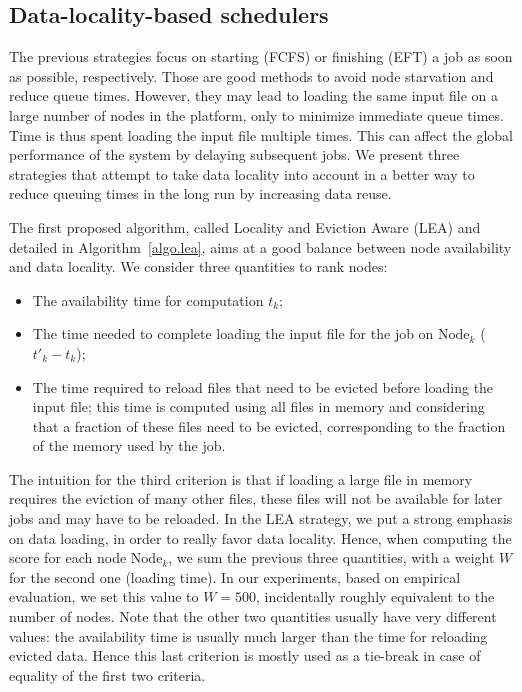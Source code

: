 \documentclass[conference]{IEEEtran}
\newcommand{\Node}[1]{\ensuremath{\mathrm{Node}_{#1}}\xspace}
\begin{document}
\subsection{Data-locality-based schedulers}

The previous strategies focus on starting (FCFS) or finishing (EFT) a job
as soon as possible, respectively.  Those are good methods
to avoid node starvation and reduce queue times.  However, they
may lead to loading the same input file on a large number of nodes in
the platform, only to minimize immediate queue times. Time is thus spent
loading the input file multiple times. This can affect the global
performance of the system by delaying subsequent jobs.  We present three
strategies that attempt to take data locality into account in a better way to reduce queuing times in the long run by increasing data reuse.

The first proposed algorithm, called Locality and Eviction Aware (LEA)
and detailed in Algorithm~\ref{algo.lea}, aims at a good balance
between node availability and data locality.  We consider three
quantities to rank nodes:
\begin{itemize}
\item The availability time for computation $t_k$;
\item The time needed to complete loading the input file for the job
  on \Node{k} ($t'_k - t_k$);
\item The time required to reload files that need to be evicted before
  loading the input file; this time is computed using all files in
  memory and considering that a fraction of these files need to be
  evicted, corresponding to the fraction of the memory used by the job.
\end{itemize}

The intuition for the third criterion is that if loading a large file
in memory requires the eviction of many other files, these files will not
be available for later jobs and may have to be reloaded.
In the LEA strategy, we put a strong emphasis on data loading, in order
to really favor data locality. Hence, when computing the score for
each node \Node{k}, we sum the previous three quantities, with a weight
$W$ for the second one (loading time). In our experiments, based on
empirical evaluation, we set this value to $W=500$, incidentally roughly
equivalent to the number of nodes.
Note that the other two quantities usually have very different values:
the availability time is usually much larger than the time for
reloading evicted data. Hence this last criterion is mostly used as a
tie-break in case of equality of the first two criteria.
\end{document}
